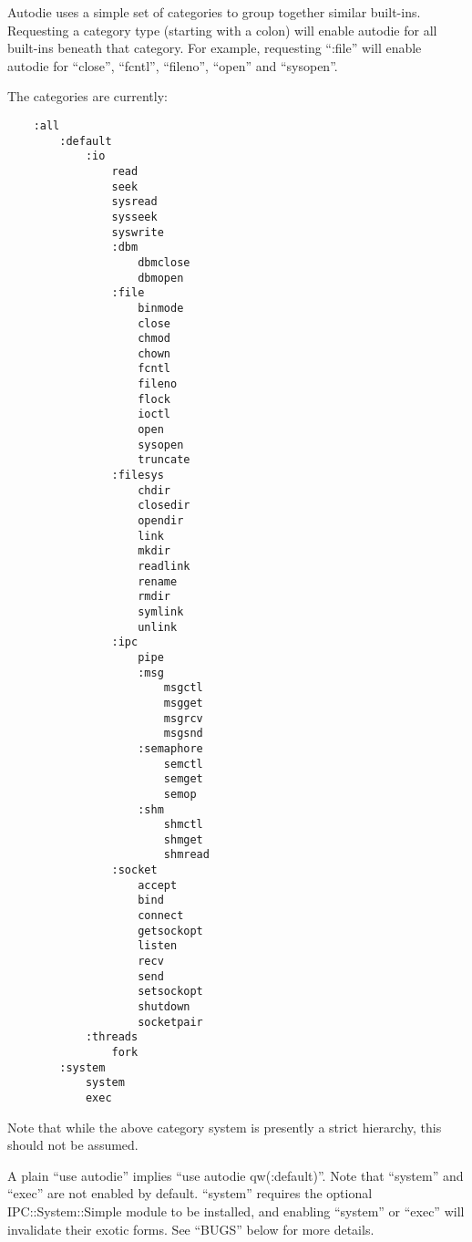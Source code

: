 \documentclass[]{article}
\begin{document}
Autodie uses a simple set of categories to group together similar
built-ins. Requesting a category type (starting with a colon) will
enable autodie for all built-ins beneath that category. For example,
requesting ``:file'' will enable autodie for ``close'', ``fcntl'',
``fileno'', ``open'' and ``sysopen''.

The categories are currently:

\begin{verbatim}
    :all
        :default
            :io
                read
                seek
                sysread
                sysseek
                syswrite
                :dbm
                    dbmclose
                    dbmopen
                :file
                    binmode
                    close
                    chmod
                    chown
                    fcntl
                    fileno
                    flock
                    ioctl
                    open
                    sysopen
                    truncate
                :filesys
                    chdir
                    closedir
                    opendir
                    link
                    mkdir
                    readlink
                    rename
                    rmdir
                    symlink
                    unlink
                :ipc
                    pipe
                    :msg
                        msgctl
                        msgget
                        msgrcv
                        msgsnd
                    :semaphore
                        semctl
                        semget
                        semop
                    :shm
                        shmctl
                        shmget
                        shmread
                :socket
                    accept
                    bind
                    connect
                    getsockopt
                    listen
                    recv
                    send
                    setsockopt
                    shutdown
                    socketpair
            :threads
                fork
        :system
            system
            exec
\end{verbatim}

Note that while the above category system is presently a strict
hierarchy, this should not be assumed.

A plain ``use autodie'' implies ``use autodie qw(:default)''. Note that
``system'' and ``exec'' are not enabled by default. ``system'' requires
the optional IPC::System::Simple module to be installed, and enabling
``system'' or ``exec'' will invalidate their exotic forms. See ``BUGS''
below for more details.
\end{document}
